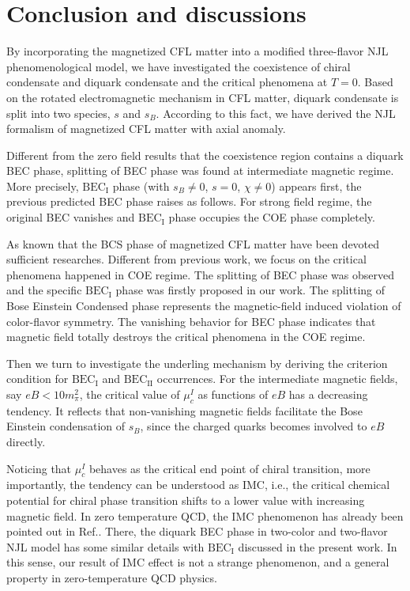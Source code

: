 \documentclass[prd, showpacs,nofootinbib,amsmath,amssymb,12pt]{revtex4}
\begin{document}
\section{Conclusion and discussions}

By incorporating the magnetized CFL matter into  a modified three-flavor NJL phenomenological model,
we have investigated the coexistence of chiral condensate and diquark condensate and the critical phenomena at $T=0$.
Based on the rotated electromagnetic mechanism in CFL matter, diquark condensate is split into two species, $s$ and $s_B$.
According to this fact, we have derived the NJL formalism of magnetized CFL matter with axial anomaly.


Different from the zero field results that the coexistence region  contains a diquark
BEC phase,  splitting of BEC phase was found at intermediate magnetic regime.
More precisely, $\text{BEC}_\text{I}$ phase (with $s_B \neq 0$, $s = 0$,
$\chi \neq 0$)
appears first,  the previous predicted BEC phase raises as follows.
For strong field regime, the original BEC vanishes and
$\text{BEC}_\text{I}$ phase occupies the COE phase completely.


As known that the BCS phase of magnetized CFL matter have been devoted sufficient researches.
Different from previous work, we focus on the critical phenomena happened in COE regime.
The splitting of BEC phase was observed and the specific $\text{BEC}_\text{I}$ phase was firstly proposed in our work.
The splitting of Bose Einstein Condensed phase represents the magnetic-field induced
violation of color-flavor symmetry.
The vanishing behavior for BEC phase indicates that magnetic field totally
destroys the critical phenomena in the COE regime.

Then we turn to investigate the underling mechanism by deriving the criterion condition for  $\text{BEC}_\text{I}$ and  $\text{BEC}_\text{II}$  occurrences.
 For the intermediate magnetic fields, say $eB < 10m_\pi^2$, the critical value of $\mu^{I}_c$ as functions of $eB$ has a decreasing tendency.
 It reflects that non-vanishing magnetic fields facilitate the Bose Einstein condensation of $s_B$, since the charged quarks becomes involved to $eB$ directly.

 Noticing that $\mu^{I}_c$ behaves as the critical end point of chiral transition, more importantly, the tendency can be understood as IMC, i.e.,
 the critical chemical potential for chiral phase transition shifts to a lower value with increasing magnetic field.
 In zero temperature QCD, the IMC phenomenon has already been pointed out in Ref.{}.
 There, the diquark BEC phase in two-color and two-flavor NJL model has some similar details with  $\text{BEC}_\text{I}$ discussed in the present work.
 In this sense, our result of IMC effect is not a strange phenomenon, and a general property in zero-temperature QCD physics.
\end{document}

